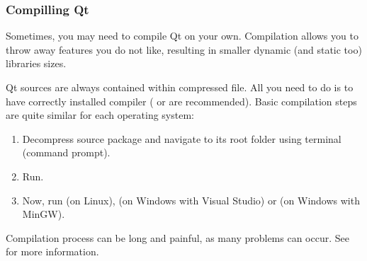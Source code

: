 \subsubsection{Compilling Qt}
Sometimes, you may need to compile Qt on your own. Compilation allows you to throw away features you do not like, resulting in smaller dynamic (and static too) libraries sizes.

Qt sources are always contained within compressed file. All you need to do is to have correctly installed \cpp compiler ( or  are recommended). Basic compilation steps are quite similar for each operating system:
\begin{enumerate}
\item Decompress source package and navigate to its root folder using terminal (command prompt).
\item Run.
\item Now, run (on Linux), (on Windows with Visual Studio) or (on Windows with MinGW).
\end{enumerate}

Compilation process can be long and painful, as many problems can occur. See \citep{various:qtdoc} for more information.